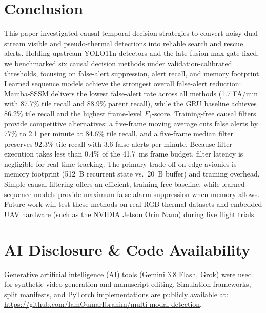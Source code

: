 \documentclass[conference]{IEEEtran}
\begin{document}
\balance

\section{Conclusion}
This paper investigated causal temporal decision strategies to convert noisy dual-stream visible and pseudo-thermal detections into reliable search and rescue alerts. Holding upstream YOLO11n detectors and the late-fusion max gate fixed, we benchmarked six causal decision methods under validation-calibrated thresholds, focusing on false-alert suppression, alert recall, and memory footprint. Learned sequence models achieve the strongest overall false-alert reduction: Mamba-SSSM delivers the lowest false-alert rate across all methods (1.7 FA/min with 87.7\% tile recall and 88.9\% parent recall), while the GRU baseline achieves 86.2\% tile recall and the highest frame-level $F_1\text{-score}$. Training-free causal filters provide competitive alternatives: a five-frame moving average cuts false alerts by 77\% to 2.1 per minute at 84.6\% tile recall, and a five-frame median filter preserves 92.3\% tile recall with 3.6 false alerts per minute. Because filter execution takes less than 0.4\% of the 41.7~ms frame budget, filter latency is negligible for real-time tracking. The primary trade-off on edge avionics is memory footprint (512~B recurrent state vs.\ 20~B buffer) and training overhead. Simple causal filtering offers an efficient, training-free baseline, while learned sequence models provide maximum false-alarm suppression when memory allows. Future work will test these methods on real RGB-thermal datasets and embedded UAV hardware (such as the NVIDIA Jetson Orin Nano) during live flight trials.

\section*{AI Disclosure \& Code Availability}
Generative artificial intelligence (AI) tools (Gemini 3.8 Flash, Grok) were used for synthetic video generation and manuscript editing. Simulation frameworks, split manifests, and PyTorch implementations are publicly available at: \url{https://github.com/IamOumarIbrahim/multi-modal-detection}.



\end{document}
